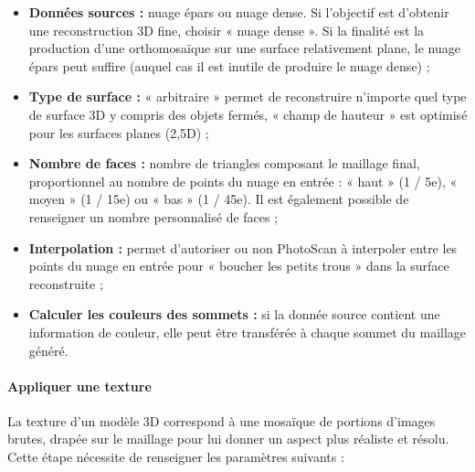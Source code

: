 \begin{itemize}
    \item \textbf{Données sources :} nuage épars ou nuage dense. Si l’objectif est d’obtenir une reconstruction 3D fine, choisir « nuage dense ». Si la finalité est la production d’une orthomosaïque sur une surface relativement plane, le nuage épars peut suffire (auquel cas il est inutile de produire le nuage dense) ;
    
    \item \textbf{Type de surface :} « arbitraire » permet de reconstruire n’importe quel type de surface 3D y compris des objets fermés, « champ de hauteur » est optimisé pour les surfaces planes (2,5D) ;
    
    \item \textbf{Nombre de faces :} nombre de triangles composant le maillage final, proportionnel au nombre de points du nuage en entrée : « haut » (1 / 5e), « moyen » (1 / 15e) ou « bas » (1 / 45e). Il est également possible de renseigner un nombre personnalisé de faces ; 
    
    \item \textbf{Interpolation :} permet d’autoriser ou non PhotoScan à interpoler entre les points du nuage en entrée pour « boucher les petits trous » dans la surface reconstruite ;
    
    \item \textbf{Calculer les couleurs des sommets :} si la donnée source contient une information de couleur, elle peut être transférée à chaque sommet du maillage généré.
\end{itemize}

\paragraph{Appliquer une texture}

La texture d’un modèle 3D correspond à une mosaïque de portions d’images brutes, drapée sur le maillage pour lui donner un aspect plus réaliste et résolu. Cette étape nécessite de renseigner les paramètres suivants :

